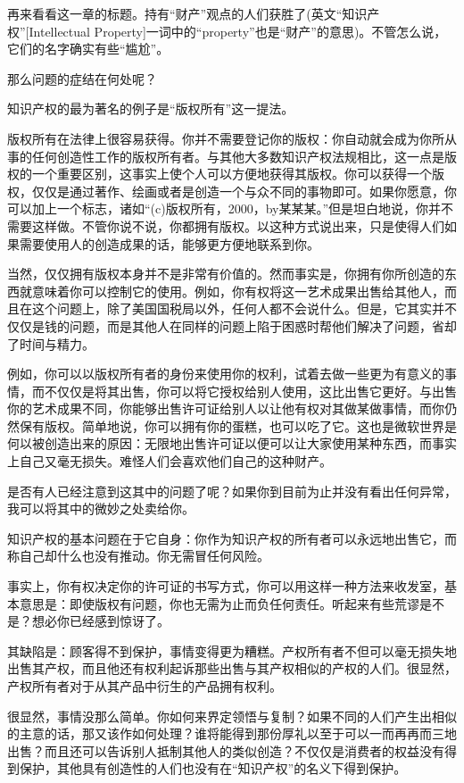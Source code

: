 再来看看这一章的标题。持有“财产”观点的人们获胜了(英文“知识产权”[Intellectual Property]一词中的“property”也是“财产”的意思)。不管怎么说，它们的名字确实有些“尴尬”。

那么问题的症结在何处呢？

知识产权的最为著名的例子是“版权所有”这一提法。

版权所有在法律上很容易获得。你并不需要登记你的版权：你自动就会成为你所从事的任何创造性工作的版权所有者。与其他大多数知识产权法规相比，这一点是版权的一个重要区别，这事实上使个人可以方便地获得其版权。你可以获得一个版权，仅仅是通过著作、绘画或者是创造一个与众不同的事物即可。如果你愿意，你可以加上一个标志，诸如“(c)版权所有，2000，by某某某。”但是坦白地说，你并不需要这样做。不管你说不说，你都拥有版权。以这种方式说出来，只是使得人们如果需要使用人的创造成果的话，能够更方便地联系到你。

当然，仅仅拥有版权本身并不是非常有价值的。然而事实是，你拥有你所创造的东西就意味着你可以控制它的使用。例如，你有权将这一艺术成果出售给其他人，而且在这个问题上，除了美国国税局以外，任何人都不会说什么。但是，它其实并不仅仅是钱的问题，而是其他人在同样的问题上陷于困惑时帮他们解决了问题，省却了时间与精力。

例如，你可以以版权所有者的身份来使用你的权利，试着去做一些更为有意义的事情，而不仅仅是将其出售，你可以将它授权给别人使用，这比出售它更好。与出售你的艺术成果不同，你能够出售许可证给别人以让他有权对其做某做事情，而你仍然保有版权。简单地说，你可以拥有你的蛋糕，也可以吃了它。这也是微软世界是何以被创造出来的原因：无限地出售许可证以便可以让大家使用某种东西，而事实上自己又毫无损失。难怪人们会喜欢他们自己的这种财产。

是否有人已经注意到这其中的问题了呢？如果你到目前为止并没有看出任何异常，我可以将其中的微妙之处卖给你。

知识产权的基本问题在于它自身：你作为知识产权的所有者可以永远地出售它，而称自己却什么也没有推动。你无需冒任何风险。

事实上，你有权决定你的许可证的书写方式，你可以用这样一种方法来收发室，基本意思是：即使版权有问题，你也无需为止而负任何责任。听起来有些荒谬是不是？想必你已经感到惊讶了。

其缺陷是：顾客得不到保护，事情变得更为糟糕。产权所有者不但可以毫无损失地出售其产权，而且他还有权利起诉那些出售与其产权相似的产权的人们。很显然，产权所有者对于从其产品中衍生的产品拥有权利。

很显然，事情没那么简单。你如何来界定领悟与复制？如果不同的人们产生出相似的主意的话，那又该作如何处理？谁将能得到那份厚礼以至于可以一而再再而三地出售？而且还可以告诉别人抵制其他人的类似创造？不仅仅是消费者的权益没有得到保护，其他具有创造性的人们也没有在“知识产权”的名义下得到保护。

